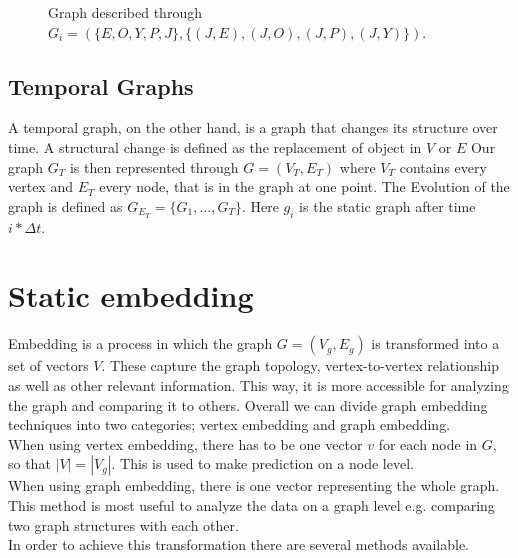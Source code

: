 \documentclass[sigconf]{acmart}
\begin{document}
 \begin{figure}[h]
  \begin{center}
\end{center}
\caption{Graph described through \\ \( G_i = (\{E,O,Y,P,J\}, \{(J,E),(J,O), (J,P), (J,Y)\}) \).}
\end{figure}

\subsection{Temporal Graphs}
A temporal graph, on the other hand, is a graph that changes its structure over time. A structural change is defined as the replacement of object in \(V\) or \(E\)  %
Our graph \(G_T\) is then represented through \(G = (V_T,E_T)\) where \(V_T\) contains every vertex and \(E_T\) every node, that is in the graph at one point.
The Evolution of the graph is defined as \(G_{E_T} = \{G_1, \ldots, G_T\}\). Here \(g_i\) is the static graph after time \(i*\Delta t\).
\cite{DBLP:journals/corr/abs-1905-05304}


\section{Static embedding}
Embedding is a process in which the graph \(G = (V_g, E_g)\) is transformed into a set of vectors \(V\).
These capture the graph topology, vertex-to-vertex relationship as well as other relevant information.
This way, it is more accessible for analyzing the graph and comparing it to others.
Overall we can divide graph embedding techniques into two categories; 
vertex embedding and graph embedding. \\
When using vertex embedding, there has to be one vector \(v\) for each node in \(G\), so that \(|V| = |V_g|\). This is used to make prediction 
on a node level.\\
When using graph embedding, there is one vector representing the whole graph. This method is most useful to analyze the data on a graph level e.g.
comparing two graph structures with each other.\\
In order to achieve this transformation there are several methods available.
\end{document}

